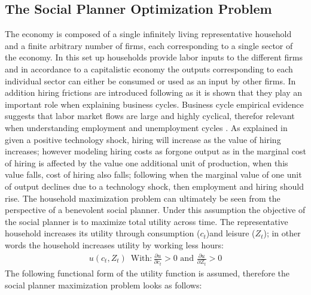 \subsection{The Social Planner Optimization Problem}
The economy is composed of a single infinitely living representative household and a finite arbitrary number of firms, each corresponding to a single sector of the economy. In this set up households provide labor inputs to the different firms and in accordance to a capitalistic economy \cite{long} the outputs corresponding to each individual sector can either be consumed or used as an input by other firms. In addition hiring frictions are introduced following \cite{christiano} as it is shown that they play an important role when explaining business cycles. Business cycle empirical evidence suggests that labor market flows are large and highly cyclical, therefor relevant when understanding employment and unemployment cycles \cite{yashiv}. As explained in \cite{shimer} given a positive technology shock, hiring will increase as the value of hiring increases; however modeling hiring costs as forgone output as in \cite{yashiv} the marginal cost of hiring is affected by the value one additional unit of production, when this value falls, cost of hiring also falls; following \cite{yashiv}when the marginal value of one unit of output declines due to a technology shock, then employment and hiring should rise.   
The household maximization problem can ultimately be seen from the perspective of a benevolent social planner. Under this assumption the objective of the social planner is to maximize total utility across time. The representative household increases its utility through consumption ($c_{t}$)and leisure ($Z_{t}$); in other words the household increases utility by working less hours:
\begin{align}
 u(c_{t}, Z_{t}) \,\,\,    \mbox{With:} \, \frac{\partial u}{\partial c_t}>0  \mbox{ and } \frac{\partial u}{\partial Z_{t}}>0 
\end{align}
The following functional form of the utility function is assumed, therefore the social planner maximization problem looks as follows: 
